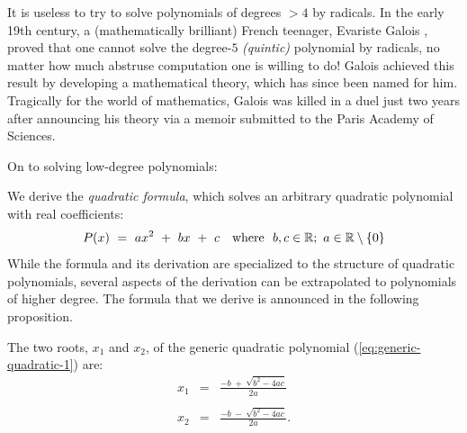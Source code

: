 It is useless to try to solve polynomials of degrees $> 4$ by
radicals.  In the early 19th century, a (mathematically brilliant)
French teenager, Evariste Galois , proved that
one cannot solve the degree-$5$ {\it (quintic)}
 polynomial by radicals, no matter how much
abstruse computation one is willing to do!  Galois achieved this
result by developing a mathematical theory, which has since been named
for him.  Tragically for the world of
mathematics, Galois was killed in a duel just two years after
announcing his theory via a memoir submitted to the Paris Academy of
Sciences.

\bigskip

\noindent
On to solving low-degree polynomials:

\medskip


\noindent
We derive the {\it quadratic formula}, which solves an arbitrary
quadratic polynomial  with real
coefficients:  
\begin{equation}
\label{eq:generic-quadratic-1}
P(x) \ = \  ax^2 \ + \ bx \ + \ c \ \ \mbox{  where  } \ b,c \in \mathbb{R};
\ a \in \mathbb{R} \setminus \{0\}
\end{equation}
While the formula and its derivation are specialized to the structure
of quadratic polynomials, several aspects of the derivation can be
extrapolated to polynomials of higher degree.  The formula that we
derive is announced in the following proposition.  

\begin{prop}
\label{thm:quadratic-formula}
The two roots, $x_1$ and $x_2$, of the generic quadratic polynomial
(\ref{eq:generic-quadratic-1}) are:
\begin{eqnarray}
\nonumber
x_1 & = & \frac{-b \ + \ \sqrt{b^2 -4ac}}{2a} \\
\label{eq:generic-quadratic-4}
    &   & \\
\nonumber
x_2 & = & \frac{-b \ - \ \sqrt{b^2 -4ac}}{2a}.
\end{eqnarray}
\end{prop}


